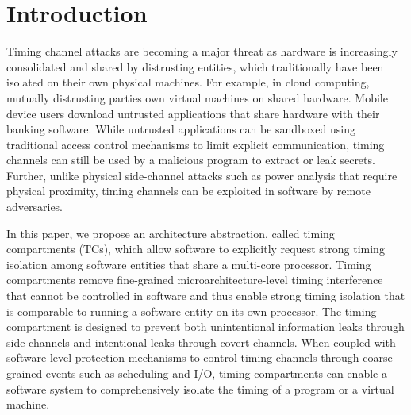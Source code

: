 \section{Introduction}

Timing channel attacks are becoming a major threat as hardware is increasingly 
consolidated and shared by distrusting entities, which traditionally have been
isolated on their own physical machines. For example, in cloud computing, mutually distrusting 
parties own virtual machines on shared hardware.
Mobile device users download untrusted applications that share hardware with 
their banking software.
While untrusted applications can be sandboxed using
traditional access control mechanisms to limit explicit communication,
timing 
channels can still be used by a malicious program to extract or leak secrets.
Further, unlike physical side-channel attacks such as power analysis that require
physical proximity, timing channels can be exploited in software by remote
adversaries.



In this paper, we propose an architecture abstraction, called timing compartments (TCs),
which allow software to explicitly request strong timing isolation among software
entities that share a multi-core processor.
Timing compartments remove fine-grained microarchitecture-level timing interference
that cannot be controlled in software and thus enable strong timing isolation that is
comparable to running a software entity on its own processor.
The timing compartment is designed to prevent both unintentional information leaks
through side channels and intentional leaks through covert channels.
When coupled with software-level protection mechanisms to control timing channels 
through coarse-grained events such as scheduling and I/O, timing compartments
can enable a software system to comprehensively isolate the timing of a program
or a virtual machine.

